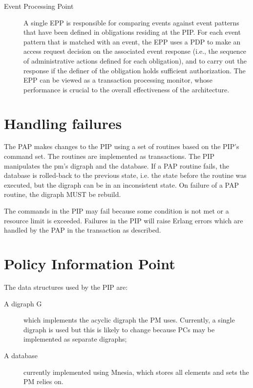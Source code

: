 \documentclass[12pt,a4paper,titlepage]{book}
\begin{document}
\begin{description}
		\item[Event Processing Point] A single EPP is responsible for comparing events against event patterns that have been defined in obligations residing at the PIP. For each event pattern that is matched with an event, the EPP uses a PDP to make an access request decision on the associated event response (i.e., the sequence of administrative actions defined for each obligation), and to carry out the response if the definer of the obligation holds sufficient authorization. The EPP can be viewed as a transaction processing monitor, whose performance is crucial to the overall effectiveness of the architecture.
		
	\end{description}

	\section{Handling failures}
	
	The PAP makes changes to the PIP using a set of routines based on the PIP's command set. The routines are implemented as transactions. The PIP manipulates the pm's digraph and the database. If a PAP routine fails, the database is rolled-back to the previous state, i.e. the state before the routine was executed, but the digraph can be in an inconsistent state. On failure of a PAP routine, the digraph MUST be rebuild.
	
	The commands in the PIP may fail because some condition is not met or a resource limit is exceeded. Failures in the PIP will raise Erlang errors which are handled by the PAP in the transaction as described.

	\section{Policy Information Point}
	
	The data structures used by the PIP are:
	
	\begin{description}

		\item[A digraph G] which implements the acyclic digraph the PM uses. Currently, a single digraph is used but this is likely to change because PCs may be implemented as separate digraphs;
		
		\item[A database] currently implemented using Mnesia, which stores all elements and sets the PM relies on.
		
	\end{description}
	
\end{document}
